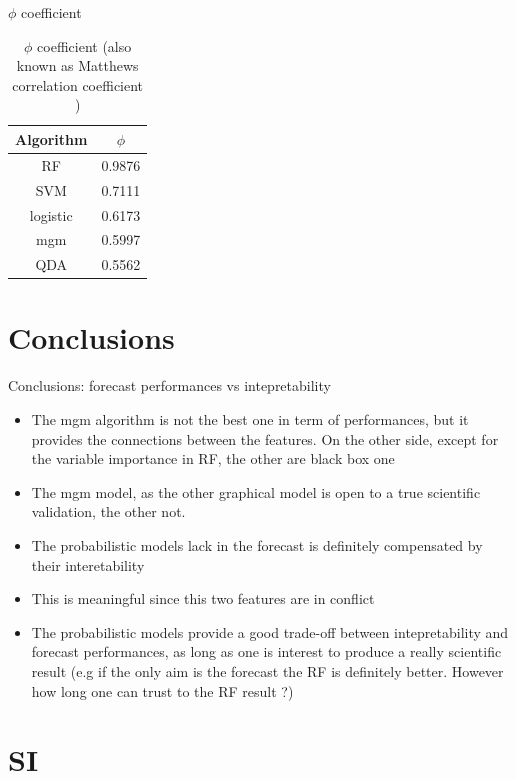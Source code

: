 \documentclass{beamer}
\begin{document}
\begin{frame}{$\phi$ coefficient}
\begin{table}[]
\caption{$\phi$ coefficient (also known as Matthews correlation coefficient )}
\begin{center}
\begin{tabular}{c|c}
Algorithm & $\phi$ \\ \hline
RF        & 0.9876 \\ \hline
SVM       & 0.7111 \\ \hline
logistic  & 0.6173 \\ \hline
mgm       & 0.5997 \\ \hline
QDA       & 0.5562 
\end{tabular}
\end{center}
\label{phi_values}
\end{table}
\end{frame}

\section{Conclusions}

\begin{frame}{Conclusions: forecast performances vs intepretability}
\begin{itemize}
\item The mgm algorithm is not the best one in term of performances, but it provides the connections between the features. On the other side, except for the variable importance in RF, the other are black box one
\item The mgm model, as the other graphical model is open to a true scientific validation, the other not. 
\item The probabilistic models lack in the forecast is definitely compensated by their interetability 
\item This is meaningful since this two features are in conflict 
\item The probabilistic models provide a good trade-off between intepretability and forecast performances, as long as one is interest to produce a really scientific result (e.g if the only aim is the forecast the RF is definitely better. However how long one can trust to the RF result ?)
\end{itemize}
\end{frame}

\section{SI}
\end{document}
